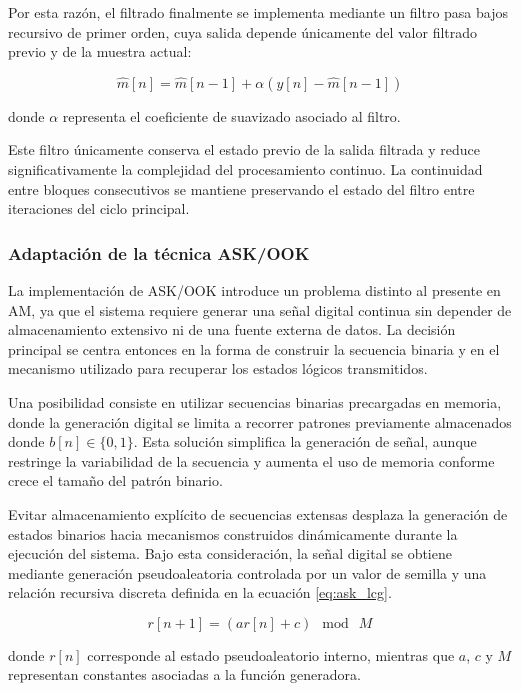 Por esta razón, el filtrado finalmente se implementa mediante un filtro pasa bajos recursivo de primer orden, cuya salida depende únicamente del valor filtrado previo y de la muestra actual:

\begin{equation}
\hat{m}[n] = \hat{m}[n-1] + \alpha\left(y[n] - \hat{m}[n-1]\right)
\label{eq:am_lpf}
\end{equation}

donde $\alpha$ representa el coeficiente de suavizado asociado al filtro.

Este filtro únicamente conserva el estado previo de la salida filtrada y reduce significativamente la complejidad del procesamiento continuo. La continuidad entre bloques consecutivos se mantiene preservando el estado del filtro entre iteraciones del ciclo principal.

\subsubsection{Adaptación de la técnica ASK/OOK}

La implementación de ASK/OOK introduce un problema distinto al presente en AM, ya que el sistema requiere generar una señal digital continua sin depender de almacenamiento extensivo ni de una fuente externa de datos. La decisión principal se centra entonces en la forma de construir la secuencia binaria y en el mecanismo utilizado para recuperar los estados lógicos transmitidos.

Una posibilidad consiste en utilizar secuencias binarias precargadas en memoria, donde la generación digital se limita a recorrer patrones previamente almacenados donde $b[n] \in \{0,1\}$. Esta solución simplifica la generación de señal, aunque restringe la variabilidad de la secuencia y aumenta el uso de memoria conforme crece el tamaño del patrón binario.

Evitar almacenamiento explícito de secuencias extensas desplaza la generación de estados binarios hacia mecanismos construidos dinámicamente durante la ejecución del sistema. Bajo esta consideración, la señal digital se obtiene mediante generación pseudoaleatoria controlada por un valor de semilla y una relación recursiva discreta definida en la ecuación \eqref{eq:ask_lcg}.

\begin{equation}
r[n+1] = (a r[n] + c)\ \bmod\ M
\label{eq:ask_lcg}
\end{equation}

donde $r[n]$ corresponde al estado pseudoaleatorio interno, mientras que $a$, $c$ y $M$ representan constantes asociadas a la función generadora.

